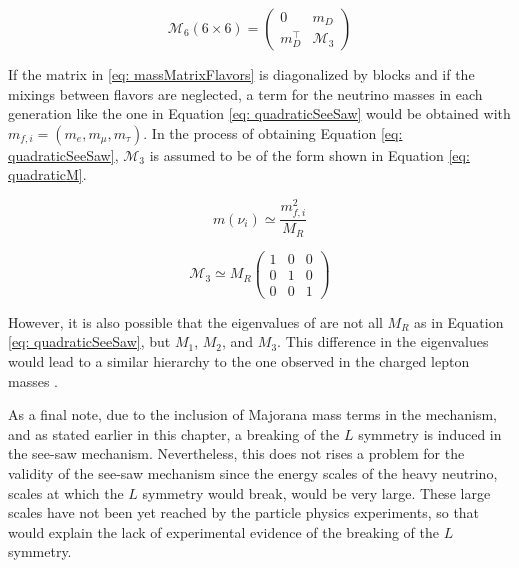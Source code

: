 \begin{equation}\label{eq: massMatrixFlavors}
\mathcal{M}_{6}(6\times 6) = \begin{pmatrix} 0&m_{D}\\m_{D}^{\intercal}&\mathcal{M_{\text{3}}} \end{pmatrix}
\end{equation}

If the matrix in \ref{eq: massMatrixFlavors} is diagonalized by blocks and if the mixings between flavors are neglected, a term for the neutrino masses in each generation like the one in Equation \ref{eq: quadraticSeeSaw} would be obtained with $m_{f,i} = (m_{e}, m_{\mu}, m_{\tau})$. In the process of obtaining Equation \ref{eq: quadraticSeeSaw}, $\mathcal{M_{\text{3}}}$ is assumed to be of the form shown in Equation \ref{eq: quadraticM}. 

\begin{equation}\label{eq: quadraticSeeSaw}
m(\nu_{i}) \simeq \frac{m_{f,i}^2}{M_{R}}
\end{equation}

\begin{equation}\label{eq: quadraticM}
\mathcal{M_{\text{3}}} \simeq M_{R} \begin{pmatrix} 1 & 0 & 0\\0 & 1 & 0 \\ 0 & 0 & 1 \end{pmatrix}
\end{equation}

However, it is also possible that the eigenvalues of are not all $M_{R}$ as in Equation \ref{eq: quadraticSeeSaw}, but $M_{1}$, $M_{2}$, and $M_{3}$. This difference in the eigenvalues would lead to a similar hierarchy to the one observed in the charged lepton masses \cite{NeutrinoMass}. 

As a final note, due to the inclusion of Majorana mass terms in the mechanism, and as stated earlier in this chapter, a breaking of the $L$ symmetry is induced in the see-saw mechanism. Nevertheless, this does not rises a problem for the validity of the see-saw mechanism since the energy scales of the heavy neutrino, scales at which the $L$ symmetry would break, would be very large. These large scales have not been yet reached by the particle physics experiments, so that would explain the lack of experimental evidence of the breaking of the $L$ symmetry.












 


